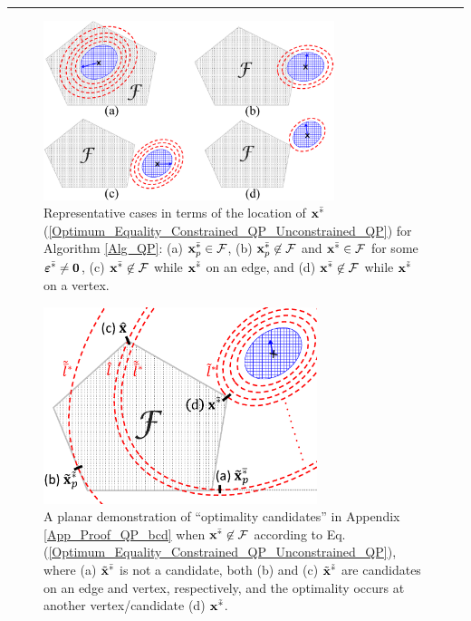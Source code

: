 \documentclass{imaman}
\newcommand{\bfx}{{\bf x}}
\newcommand{\bfvarepsilon}{{\boldsymbol \varepsilon}}
\newcommand{\bfzero}{{\bf 0}}
\newcommand{\calF}{{\mathcal F}}
\numberwithin{equation}{section}
\begin{document}
\hrule
\vspace{0.2cm}

\begin{figure}[htbp]
    \begin{center}
    \includegraphics[width=8.5cm]{Fig_Locations.eps}
    \caption{Representative cases in terms of the location of $\bfx^{\bar *}$ {\rm(\ref{Optimum_Equality_Constrained_QP_Unconstrained_QP})} for Algorithm {\rm\ref{Alg_QP}}: (a) $\bfx_p^{\bar *}\in\calF$, (b) $\bfx_p^{\bar *}\not\in\calF$ and $\bfx^{\bar *}\in\calF$ for some $\bfvarepsilon^{\bar *}\ne\bfzero$, (c) $\bfx^{\bar *}\not\in\calF$ while $\bfx^{\tilde *}$ on an edge, and (d) $\bfx^{\bar *}\not\in\calF$ while $\bfx^{\tilde *}$ on a vertex.}
    \label{Fig_Locations}
    \end{center}
\end{figure}

\begin{figure}[htbp]
    \begin{center}
    \includegraphics[width=8cm]{Fig_Candidates.eps}
    \caption{A planar demonstration of ``optimality candidates'' in Appendix {\rm\ref{App_Proof_QP_bcd}} when $\bfx^{\bar *}\not\in\calF$ according to Eq. {\rm(\ref{Optimum_Equality_Constrained_QP_Unconstrained_QP})}, where (a) $\tilde\bfx^{\bar *}$ is not a candidate, both (b) and (c) $\tilde\bfx^{\tilde *}$ are candidates on an edge and vertex, respectively, and the optimality occurs at another vertex/candidate (d) $\bfx^{\tilde *}$.}
    \label{Fig_Candidates}
    \end{center}
\end{figure}
\end{document}
